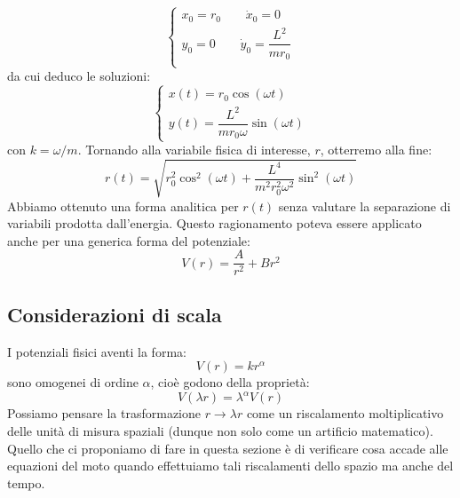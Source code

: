\documentclass[a4paper,openany]{article}
\begin{document}
	\begin{equation}
		\begin{cases}
			x_{0} = r_{0}  \>\>\>\>\>\>\>\>\> \dot{x}_{0} = 0 \\
			y_{0} = 0  \>\>\>\>\>\>\>\>\> \dot{y}_{0} = \dfrac{L^{2}}{mr_{0}} \\
		\end{cases}
	\end{equation}
	da cui deduco le soluzioni:
	\begin{equation}
		\begin{cases}
			x(t) = r_{0}\cos(\omega t) \\
			y(t) = \dfrac{L^{2}}{mr_{0}\omega}\sin(\omega t)
		\end{cases}
	\end{equation}
	con $k = \omega/m$. Tornando alla variabile fisica di interesse, $r$, otterremo alla fine:
	$$
	r(t) = \sqrt{r_{0}^{2}\cos^{2}(\omega t) + \dfrac{L^{4}}{m^{2}r_{0}^{2}\omega^{2}}\sin^{2}(\omega t)}
	$$
	Abbiamo ottenuto una forma analitica per $r(t)$ senza valutare la separazione di variabili prodotta dall'energia.
	Questo ragionamento poteva essere applicato anche per una generica forma del potenziale:
	$$
	V(r) = \dfrac{A}{r^{2}} + Br^{2}
	$$
	\subsection{Considerazioni di scala}
	I potenziali fisici aventi la forma:
	$$
	V(r) = k r^{\alpha}
	$$
	sono omogenei di ordine $\alpha$, cioè godono della proprietà:
	$$
	V(\lambda r) = \lambda^{\alpha} V(r)
	$$
	Possiamo pensare la trasformazione $r \rightarrow \lambda r$ come un riscalamento moltiplicativo delle unità di misura spaziali (dunque non solo come un artificio matematico). Quello che ci proponiamo di fare in questa sezione è di verificare cosa accade alle equazioni del moto quando effettuiamo tali riscalamenti dello spazio ma anche del tempo.
	
\end{document}
